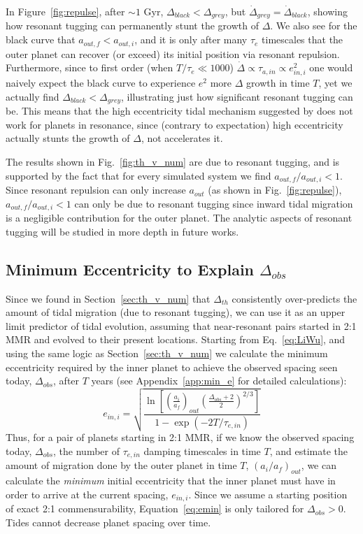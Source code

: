 In Figure~\ref{fig:repulse}, after $\sim1$ Gyr, $\Delta_{black} < \Delta_{grey}$, but $\dot{\Delta}_{grey} = \dot{\Delta}_{black}$, showing how resonant tugging can permanently stunt the growth of $\Delta$.
We also see for the black curve that $a_{out,f} < a_{out,i}$, and it is only after many $\tau_e$ timescales that the outer planet can recover (or exceed) its initial position via resonant repulsion. 
Furthermore, since to first order (when $T/\tau_e \ll 1000$) $\dot{\Delta} \propto \tau_{a,in} \propto e_{in,i}^2$ one would naively expect the black curve to experience $e^2$ more $\Delta$ growth in time $T$, yet we actually find $\Delta_{black} < \Delta_{grey}$, illustrating just how significant resonant tugging can be.
This means that the high eccentricity tidal mechanism suggested by \citet{Delisle2014} does not work for planets in resonance, since (contrary to expectation) high eccentricity actually stunts the growth of $\Delta$, not accelerates it. 

The results shown in Fig.~\ref{fig:th_v_num} are due to resonant tugging, and is supported by the fact that for every simulated \kep{} system we find $a_{out,f} / a_{out,i} < 1$. 
Since resonant repulsion can only increase $a_{out}$ (as shown in Fig.~\ref{fig:repulse}), $a_{out,f} / a_{out,i} < 1$ can only be due to resonant tugging since inward tidal migration is a negligible contribution for the outer planet.
The analytic aspects of resonant tugging will be studied in more depth in future works.

\subsection{Minimum Eccentricity to Explain $\Delta_{obs}$}
\label{sec:mine}
Since we found in Section~\ref{sec:th_v_num} that $\Delta_{th}$ consistently over-predicts the amount of tidal migration (due to resonant tugging), we can use it as an upper limit predictor of tidal evolution, assuming that near-resonant pairs started in 2:1 MMR and evolved to their present locations. 
Starting from Eq.~\ref{eq:LiWu}, and using the same logic as Section~\ref{sec:th_v_num} we calculate the minimum eccentricity required by the inner planet to achieve the observed spacing seen today, $\Delta_{obs}$, after $T$ years (see Appendix~\ref{app:min_e} for detailed calculations):
\begin{equation}
e_{in,i} = \sqrt{\frac{\ln[(\frac{a_i}{a_f})_{out} (\frac{\Delta_{obs} + 2}{2})^{2/3}]}{1 - \exp(-2T/\tau_{e,in})}}
\label{eq:emin}
\end{equation}
Thus, for a pair of planets starting in 2:1 MMR, if we know the observed spacing today, $\Delta_{obs}$, the number of $\tau_{e,in}$ damping timescales in time $T$, and estimate the amount of migration done by the outer planet in time $T$, $(a_i /a_f)_{out}$, we can calculate the {\it minimum} initial eccentricity that the inner planet must have in order to arrive at the current spacing, $e_{in,i}$. 
Since we assume a starting position of exact 2:1 commensurability, Equation~\ref{eq:emin} is only tailored for $\Delta_{obs} > 0$. Tides cannot decrease planet spacing over time.

